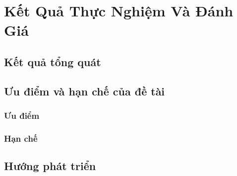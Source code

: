 \chapter{Kết Quả Thực Nghiệm Và Đánh Giá}
\section{Kết quả tổng quát}

\newpage
\section{Ưu điểm và hạn chế của đề tài}
\subsection{Ưu điểm}
\subsection{Hạn chế}

\newpage
\section{Hướng phát triển}
